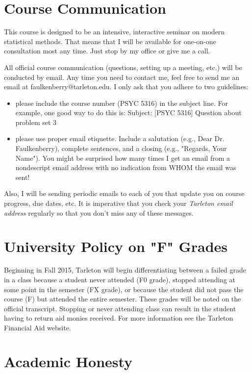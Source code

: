 \documentclass[10pt]{article}
\begin{document}
\section*{Course Communication}
\label{sec-6}

This course is designed to be an intensive, interactive seminar on modern statistical methods.  That means that I will be available for one-on-one consultation most any time.  Just stop by my office or give me a call.

All official course communication (questions, setting up a meeting, etc.) will be conducted by email.  Any time you need to contact me, feel free to send me an email at faulkenberry@tarleton.edu.  I only ask that you adhere to two guidelines:
\begin{itemize}
\item please include the course number (PSYC 5316) in the subject line.  For example, one good way to do this is:  Subject: [PSYC 5316] Question about problem set 3
\item please use proper email etiquette.  Include a salutation (e.g., Dear Dr. Faulkenberry), complete sentences, and a closing (e.g., "Regards, Your Name").  You might be surprised how many times I get an email from a nondescript email address with no indication from WHOM the email was sent!
\end{itemize}

Also, I will be sending periodic emails to each of you that update you on course progress, due dates, etc.  It is imperative that you check your \emph{Tarleton email address} regularly so that you don't miss any of these messages.

\section*{University Policy on "F" Grades}
\label{sec-7}
Beginning in Fall 2015, Tarleton will begin differentiating between a failed grade in a class because a student never attended (F0 grade), stopped attending at some point in the semester (FX grade), or because the student did not pass the course (F) but attended the entire semester. These grades will be noted on the official transcript. Stopping or never attending class can result in the student having to return aid monies received.  For more information see the Tarleton Financial Aid website.

\section*{Academic Honesty}
\label{sec-8}
\end{document}
